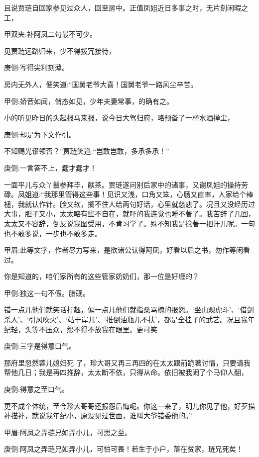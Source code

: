 \begin{parag}
    且说贾琏自回家参见过众人，回至房中。正值凤姐近日多事之时，无片刻闲暇之工，\begin{note}甲双夹:补阿凤二句最不可少。\end{note}见贾琏远路归来，少不得拨冗接待，\begin{note}庚侧:写得尖利刻薄。\end{note}房内无外人，便笑道:“国舅老爷大喜！国舅老爷一路风尘辛苦。\begin{note}甲侧:娇音如闻，俏态如见，少年夫妻常事，的确有之。\end{note}小的听见昨日的头起报马来报，说今日大驾归府，略预备了一杯水酒掸尘，\begin{note}庚侧:却是为下文作引。\end{note}不知赐光谬领否？”贾琏笑道:“岂敢岂敢，多承多承！”\begin{note}庚侧:一言答不上，蠢才蠢才！\end{note}一面平儿与众丫鬟参拜毕，献茶。贾琏遂问别后家中的诸事，又谢凤姐的操持劳碌。凤姐道:“我那里管得这些事！见识又浅，口角又笨，心肠又直率，人家给个棒槌，我就认作针。脸又软，搁不住人给两句好话，心里就慈悲了。况且又没经历过大事，胆子又小，太太略有些不自在，就吓的我连觉也睡不著了。我苦辞了几回，太太又不容辞，倒反说我图受用，不肯习学了。殊不知我是捻著一把汗儿呢。一句也不敢多说，一步也不敢多走。\begin{note}甲眉:此等文字，作者尽力写来，是欲诸公认得阿凤，好看以后之书，勿作等闲看过。\end{note}你是知道的，咱们家所有的这些管家奶奶们，那一位是好缠的？\begin{note}甲侧:独这一句不假。脂砚。\end{note}错一点儿他们就笑话打趣，偏一点儿他们就指桑骂槐的报怨。‘坐山观虎斗’、‘借剑杀人’、‘引风吹火’、‘站干岸儿’、‘推倒油瓶儿不扶’，都是全挂子的武艺。况且我年纪轻，头等不压众，怨不得不放我在眼里。更可笑\begin{note}庚侧:三字是得意口气。\end{note}那府里忽然蓉儿媳妇死 了，珍大哥又再三再四的在太太跟前跪著讨情，只要请我帮他几日；我是再四推辞，太太断不依，只得从命。依旧被我闹了个马仰人翻，\begin{note}庚侧:得意之至口气。\end{note}更不成个体统，至今珍大哥哥还报怨后悔呢。你这一来了，明儿你见了他，好歹描补描补，就说我年纪小，原没见过世面，谁叫大爷错委他的。”\begin{note}甲眉:阿凤之弄琏兄如弄小儿，可思之至。\end{note}\begin{note}庚侧:阿凤之弄琏兄如弄小儿，可怕可畏！若生于小户，落在贫家，琏兄死矣！\end{note}
\end{parag}


